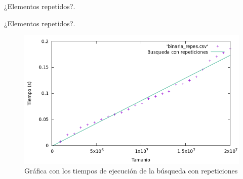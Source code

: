 \documentclass[10pt, xcolor=table]{beamer}
\begin{document}
\begin{frame}[fragile]{¿Elementos repetidos?. }
	\begin{table}[h!]
		\centering
		\footnotesize
		\caption{Experiencia empírica de la búsqueda con repeticiones}
	\end{table}
\end{frame}

\begin{frame}[fragile]{¿Elementos repetidos?. }
	\begin{figure}[h!]
		\centering
		\includegraphics[scale=0.45]{./Images/Grafica_binaria_repes.png}
		\caption{Gráfica con los tiempos de ejecución de la búsqueda con repeticiones}
	\end{figure}
\end{frame}
\end{document}
